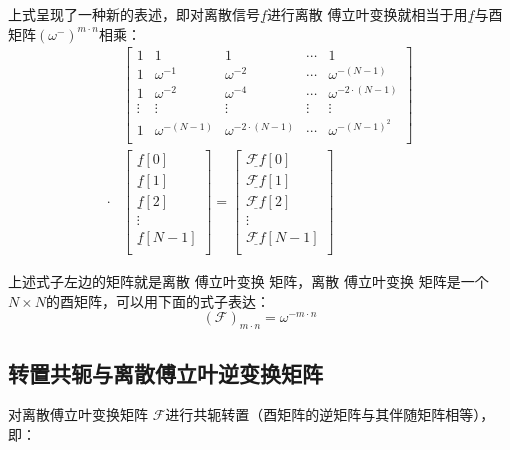 上式呈现了一种新的表述，即对离散信号$\underline{f}$进行离散 傅立叶变换就相当于用$\underline{f}$与酉矩阵$(\omega^-)^{m\cdot n}$相乘：
\begin{align*}
	      & \left[
		\begin{matrix}
			1      & 1               & 1                     & \cdots & 1                     \\
			1      & \omega^{-1}     & \omega^{-2}           & \cdots & \omega^{-(N-1)}       \\
			1      & \omega^{-2}     & \omega^{-4}           & \cdots & \omega^{-2\cdot(N-1)} \\
			\vdots & \vdots          & \vdots                & \vdots & \vdots                \\
			1      & \omega^{-(N-1)} & \omega^{-2\cdot(N-1)} & \cdots & \omega^{-(N-1)^2}     \\
		\end{matrix}
		\right]        \\
	\cdot &
	\left[
		\begin{matrix}
			\underline{f}[0]   \\
			\underline{f}[1]   \\
			\underline{f}[2]   \\
			\vdots             \\
			\underline{f}[N-1] \\
		\end{matrix}
		\right]
	=  \left[
		\begin{matrix}
			\underline{\mathcal{F}f}[0]   \\
			\underline{\mathcal{F}f}[1]   \\
			\underline{\mathcal{F}f}[2]   \\
			\vdots                        \\
			\underline{\mathcal{F}f}[N-1] \\
		\end{matrix}
		\right]
\end{align*}

上述式子左边的矩阵就是离散 傅立叶变换 矩阵，离散 傅立叶变换 矩阵是一个$N\times N$的酉矩阵，可以用下面的式子表达：
\begin{equation}
	(\mathcal{F})_{m\cdot n}=\omega^{-m\cdot n}
\end{equation}
\subsection{转置共轭与离散傅立叶逆变换矩阵}
对离散傅立叶变换矩阵  $\mathcal{F}$进行共轭转置（酉矩阵的逆矩阵与其伴随矩阵相等），即：

